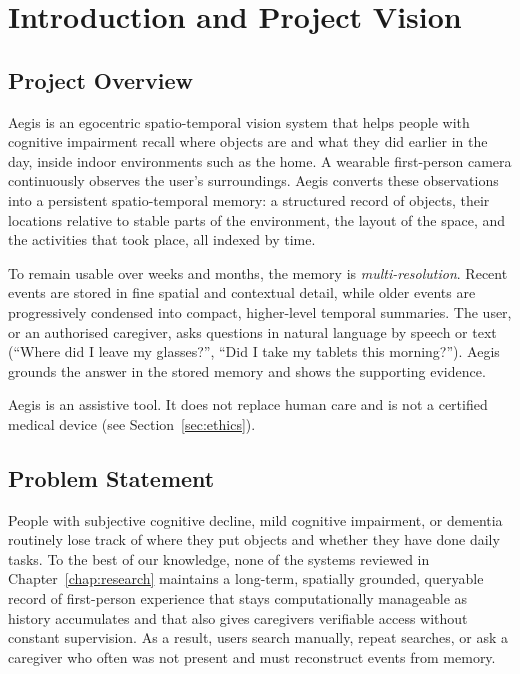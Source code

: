 \chapter{Introduction and Project Vision}
\label{chap:intro}

\section{Project Overview}
Aegis is an egocentric spatio-temporal vision system that helps people with
cognitive impairment recall where objects are and what they did earlier in the
day, inside indoor environments such as the home. A wearable first-person
camera continuously observes the user's surroundings. Aegis converts these
observations into a persistent spatio-temporal memory: a structured record of
objects, their locations relative to stable parts of the environment, the
layout of the space, and the activities that took place, all indexed by time.

To remain usable over weeks and months, the memory is \emph{multi-resolution}.
Recent events are stored in fine spatial and contextual detail, while older
events are progressively condensed into compact, higher-level temporal
summaries. The user, or an authorised caregiver, asks questions in natural
language by speech or text (``Where did I leave my glasses?'', ``Did I take my
tablets this morning?''). Aegis grounds the answer in the stored memory and
shows the supporting evidence.

Aegis is an assistive tool. It does not replace human care and is not a
certified medical device (see Section~\ref{sec:ethics}).

\section{Problem Statement}
People with subjective cognitive decline, mild cognitive impairment, or
dementia routinely lose track of where they put objects and whether they have
done daily tasks. To the best of our knowledge, none of the systems reviewed in
Chapter~\ref{chap:research} maintains a long-term, spatially grounded, queryable record of
first-person experience that stays computationally manageable as history
accumulates and that also gives caregivers verifiable access without constant
supervision. As a result, users search manually, repeat searches, or ask a
caregiver who often was not present and must reconstruct events from memory.

